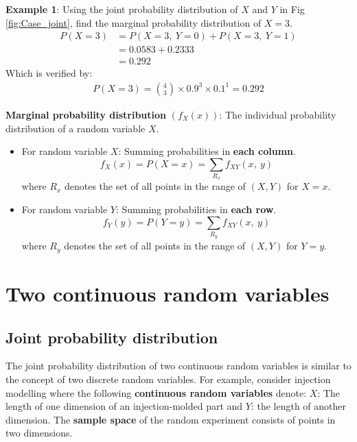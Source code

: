 \documentclass[10pt,a4paper]{article}
\begin{document}
\textbf{Example 1}: Using the joint probability distribution of $X$ and $Y$ in Fig
\ref{fig:Case_joint}, find the marginal probability distribution of $X = 3$.
\begin{align*}
    P(X=3) &= P(X=3,\: Y=0) + P(X=3,\: Y=1) \\
    &= 0.0583 + 0.2333 \\
    &= 0.292
\end{align*}
Which is verified by:
\begin{align*}
    P(X=3) = {4 \choose 3}\times 0.9^3 \times 0.1^1 = 0.292
\end{align*}

\begin{tcolorbox}[breakable,colback=white]
\textbf{Marginal probability distribution} $(f_X(x))$: The individual probability distribution of a random
variable $X$.
\\
\begin{itemize}
    \item For random variable $X$: Summing probabilities in \textbf{each column}.
    $$
    f_X(x) = P(X=x) = \sum_{R_x}f_{XY}(x,\:y)
    $$
    where $R_x$ denotes the set of all points in the range of $(X,Y)$ for $X=x$.
    \\
    \item For random variable $Y$: Summing probabilities in \textbf{each row}.
    $$
    f_Y(y) = P(Y=y) = \sum_{R_y}f_{XY}(x,\:y)
    $$
    where $R_y$ denotes the set of all points in the range of $(X,Y)$ for $Y=y$. 
\end{itemize}
\end{tcolorbox}

\section{Two continuous random variables}
\subsection{Joint probability distribution}

The joint probability distribution of two continuous random variables is similar to the concept of
two discrete random variables. For example, consider injection modelling where the following
\textbf{continuous random variables} denote: $X$: The length of one dimension of an injection-molded
part and $Y$: the length of another dimension. The \textbf{sample space} of the random experiment consists of points in two dimensions.
\end{document}
